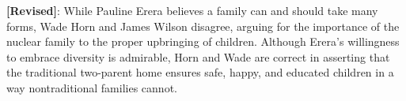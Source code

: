\textbf{[Revised]}: While Pauline Erera believes a family can and should take many forms, 
Wade Horn and James Wilson disagree, arguing for the importance of the nuclear family 
to the proper upbringing of children. Although Erera's willingness to embrace diversity is 
admirable, Horn and Wade are correct in asserting that the traditional two-parent home 
ensures safe, happy, and educated children in a way nontraditional families cannot.


